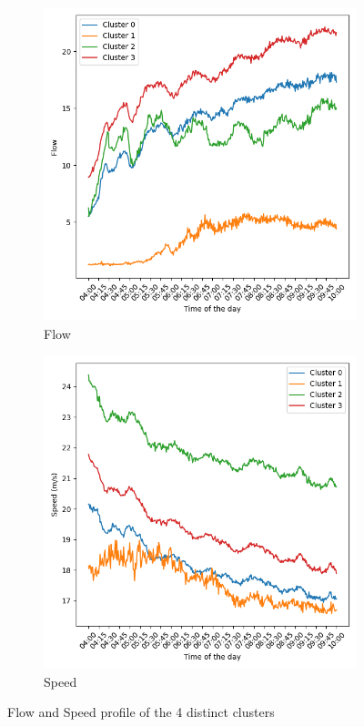 	\begin{figure}[H]
		\centering
		\begin{subfigure}{0.49 \linewidth}
			\includegraphics[width=\textwidth]{../Plots/Flow/clustering_5portals}
			\caption{Flow}
		\end{subfigure}
		\begin{subfigure}{0.49 \linewidth}
			\includegraphics[width=\textwidth]{../Plots/Speed/clustering_5portals}
			\caption{Speed}
		\end{subfigure}
		\caption{Flow and Speed profile of the 4 distinct clusters}
		\label{fig:clustering_5portals}
	\end{figure}
